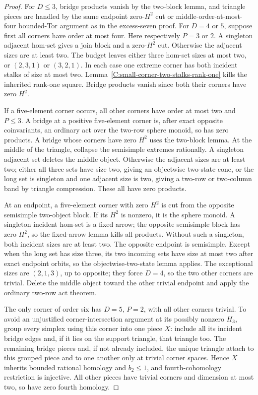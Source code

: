 \begin{proof}
For $D\leq3$, bridge products vanish by the two-block
lemma, and triangle pieces are handled by the same
endpoint zero-$H^2$ cut or middle-order-at-most-four
bounded-Tor argument as in the excess-seven proof.
For $D=4$ or $5$, suppose first all corners have order
at most four.  Here respectively $P=3$ or $2$.
A singleton adjacent hom-set gives a join block and
a zero-$H^2$ cut.  Otherwise the adjacent sizes are
at least two.  The budget leaves either three hom-set
sizes at most two, or $(2,3,1)$ or $(3,2,1)$.
In each case one extreme corner has both incident
stalks of size at most two.  Lemma~\ref{C:small-corner-two-stalks-rank-one}
kills the inherited rank-one square.  Bridge products
vanish since both their corners have zero $H^2$.

If a five-element corner occurs, all other corners
have order at most two and $P\leq3$.
A bridge at a positive five-element corner is, after
exact opposite coinvariants, an ordinary act over the
two-row sphere monoid, so has zero products.  A bridge
whose corners have zero $H^2$ uses the two-block lemma.
At the middle of the triangle, collapse the semisimple
extremes rationally.  A singleton adjacent set deletes
the middle object.  Otherwise the adjacent sizes are
at least two; either all three sets have size two,
giving an objectwise two-state cone, or the long set
is singleton and one adjacent size is two, giving
a two-row or two-column band by triangle compression.
These all have zero products.

At an endpoint, a five-element corner with zero $H^2$
is cut from the opposite semisimple two-object block.
If its $H^2$ is nonzero, it is the sphere monoid.
A singleton incident hom-set is a fixed arrow; the
opposite semisimple block has zero $H^2$, so the
fixed-arrow lemma kills all products.  Without such
a singleton, both incident sizes are at least two.
The opposite endpoint is semisimple.  Except when
the long set has size three, its two incoming sets
have size at most two after exact endpoint orbits,
so the objectwise-two-state lemma applies.
The exceptional sizes are $(2,1,3)$, up to opposite;
they force $D=4$, so the two other corners are trivial.
Delete the middle object toward the other trivial
endpoint and apply the ordinary two-row act theorem.

The only corner of order six has $D=5$, $P=2$, with
all other corners trivial.  To avoid an unjustified
corner-intersection argument at its possibly nonzero
$H_3$, group every simplex using this corner into one
piece $X$: include all its incident bridge edges and,
if it lies on the support triangle, that triangle too.
The remaining bridge pieces and, if not already included,
the unique triangle attach to this grouped piece and
to one another only at trivial corner spaces.
Hence $X$ inherits bounded rational homology and
$b_2\leq1$, and fourth-cohomology restriction is
injective.  All other pieces have trivial corners
and dimension at most two, so have zero fourth homology.


\end{proof}
